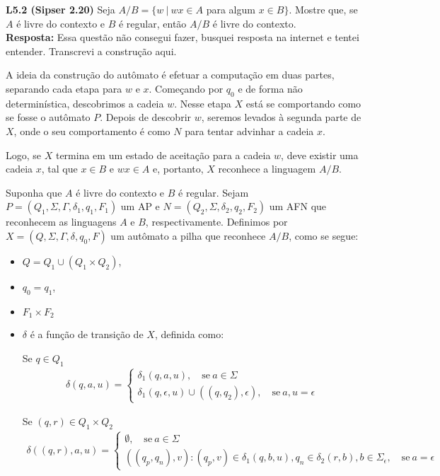 
\noindent \textbf{L5.2 (Sipser 2.20)} Seja $A/B = \{w \ |\ wx \in A$ para algum $x \in B\}$. Mostre que, se $A$ é livre do contexto e $B$ é regular, então $A/B$ é livre do contexto.\\[3pt]
\textbf{Resposta: } Essa questão não consegui fazer, busquei resposta na internet \cite{sunysb} e tentei entender. Transcrevi a construção aqui.

A ideia da construção do autômato é efetuar a computação em duas partes, separando cada etapa para $w$ e $x$. Começando por $q_0$ e de forma não determinística, descobrimos a cadeia $w$. Nesse etapa $X$ está se comportando como se fosse o autômato $P$. Depois de descobrir $w$, seremos levados à segunda parte de $X$, onde o seu comportamento é como $N$ para tentar advinhar a cadeia $x$.

Logo, se $X$ termina em um estado de aceitação para a cadeia $w$, deve existir uma cadeia $x$, tal que $x \in B$ e $wx \in A$ e, portanto, $X$ reconhece a linguagem $A/B$.

Suponha que $A$ é livre do contexto e $B$ é regular. Sejam $P = (Q_1 , \Sigma, \Gamma, \delta_1, q_1, F_1)$ um AP e $N = (Q_2, \Sigma, \delta_2, q_2, F_2)$ um AFN que reconhecem as linguagens $A$ e $B$, respectivamente. Definimos por $X = (Q, \Sigma, \Gamma, \delta, q_0, F)$ um autômato a pilha que reconhece $A/B$, como se segue:
\begin{itemize}
    \item $Q = Q_1 \cup (Q_1 \times Q_2)$,
    \item $q_0 = q_1$,
    \item $F_1 \times F_2$
    \item $\delta$ é a função de transição de $X$, definida como:
    
    Se $q \in Q_1$
    \begin{align*}
    \delta(q, a, u) = \begin{cases}
                \delta_1(q, a, u), \quad \text{se}\ a \in \Sigma \\
                \delta_1(q, \epsilon, u) \cup {((q, q_2), \epsilon)}, \quad \text{se}\ a, u = \epsilon
              \end{cases}
    \end{align*}
    
    Se $(q, r) \in Q_1 \times Q_2$
    \begin{align*}
    \delta((q, r), a, u) = \begin{cases}
                \emptyset, \quad \text{se}\ a \in \Sigma \\
                {((q_p , q_n), v) : (q_p , v) \in \delta_1(q, b, u), q_n \in \delta_2 (r, b), b \in \Sigma_{\epsilon} }, \quad \text{se}\ a = \epsilon
              \end{cases}
    \end{align*}    
\end{itemize}
